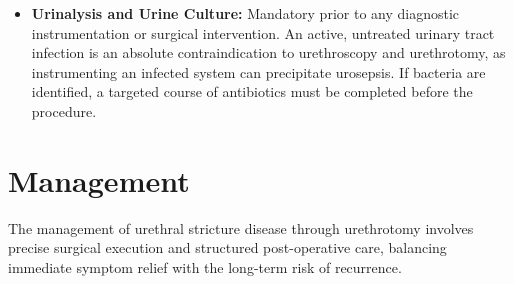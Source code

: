 \begin{itemize}
  \item \textbf{Urinalysis and Urine Culture:} Mandatory prior to any diagnostic instrumentation or surgical intervention. An active, untreated urinary tract infection is an absolute contraindication to urethroscopy and urethrotomy, as instrumenting an infected system can precipitate urosepsis. If bacteria are identified, a targeted course of antibiotics must be completed before the procedure.
\end{itemize}

\section*{Management}
The management of urethral stricture disease through urethrotomy involves precise surgical execution and structured post-operative care, balancing immediate symptom relief with the long-term risk of recurrence.

